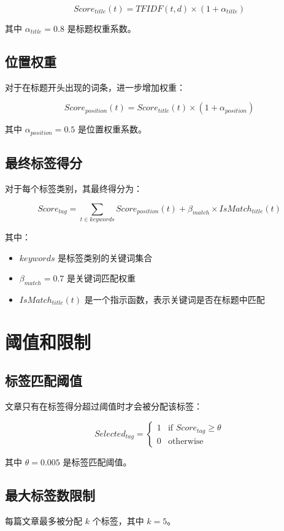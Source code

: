 \documentclass{article}
\begin{document}
\begin{CJK}{UTF8}{gbsn}
\[
Score_{title}(t) = TFIDF(t,d) \times (1 + \alpha_{title})
\]

其中 $\alpha_{title} = 0.8$ 是标题权重系数。

\subsection{位置权重}
对于在标题开头出现的词条，进一步增加权重：

\[
Score_{position}(t) = Score_{title}(t) \times (1 + \alpha_{position})
\]

其中 $\alpha_{position} = 0.5$ 是位置权重系数。

\subsection{最终标签得分}
对于每个标签类别，其最终得分为：

\[
Score_{tag} = \sum_{t \in keywords} Score_{position}(t) + \beta_{match} \times IsMatch_{title}(t)
\]

其中：
\begin{itemize}
\item $keywords$ 是标签类别的关键词集合
\item $\beta_{match} = 0.7$ 是关键词匹配权重
\item $IsMatch_{title}(t)$ 是一个指示函数，表示关键词是否在标题中匹配
\end{itemize}

\section{阈值和限制}

\subsection{标签匹配阈值}
文章只有在标签得分超过阈值时才会被分配该标签：

\[
Selected_{tag} = \begin{cases} 
1 & \text{if } Score_{tag} \geq \theta \\
0 & \text{otherwise}
\end{cases}
\]

其中 $\theta = 0.005$ 是标签匹配阈值。

\subsection{最大标签数限制}
每篇文章最多被分配 $k$ 个标签，其中 $k = 5$。

\end{CJK}
\end{document}

